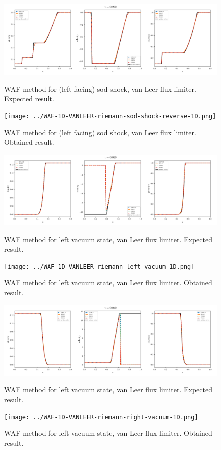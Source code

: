     \begin{figure}[htbp]
        \centering
        \includegraphics[width=.9\textwidth]{./figures/WAF-1D-VANLEER-riemann-sod-shock-reverse-1D.png}%
        \caption{WAF method for (left facing) sod shock, van Leer flux limiter. Expected result.}
        \texttt{[image: ../WAF-1D-VANLEER-riemann-sod-shock-reverse-1D.png]}%
        \caption{WAF method for (left facing) sod shock, van Leer flux limiter. Obtained result.}
    \end{figure}



    \begin{figure}[htbp]
        \centering
        \includegraphics[width=.9\textwidth]{./figures/WAF-1D-VANLEER-riemann-left-vacuum-1D.png}%
        \caption{WAF method for left vacuum state, van Leer flux limiter. Expected result.}
        \texttt{[image: ../WAF-1D-VANLEER-riemann-left-vacuum-1D.png]}
        \caption{WAF method for left vacuum state, van Leer flux limiter. Obtained result.}
    \end{figure}


    \begin{figure}[htbp]
        \centering
        \includegraphics[width=.9\textwidth]{./figures/WAF-1D-VANLEER-riemann-right-vacuum-1D.png}%
        \caption{WAF method for left vacuum state, van Leer flux limiter. Expected result.}
        \texttt{[image: ../WAF-1D-VANLEER-riemann-right-vacuum-1D.png]}
        \caption{WAF method for left vacuum state, van Leer flux limiter. Obtained result.}
    \end{figure}


